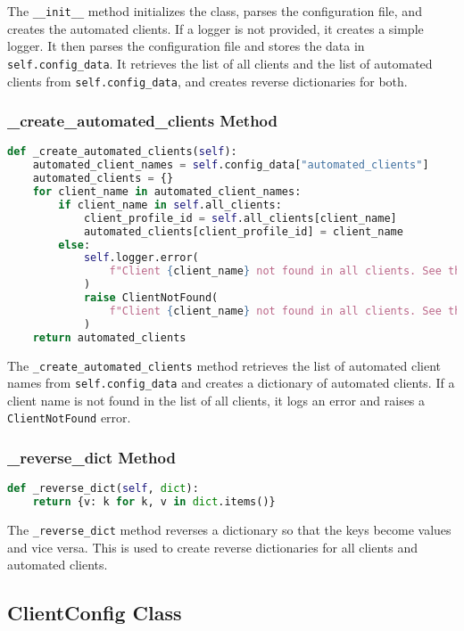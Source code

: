 The \verb|__init__| method initializes the class, parses the configuration file, and creates the automated clients. If a logger is not provided, it creates a simple logger. It then parses the configuration file and stores the data in \verb|self.config_data|. It retrieves the list of all clients and the list of automated clients from \verb|self.config_data|, and creates reverse dictionaries for both.

\subsubsection{\_create\_automated\_clients Method}

\begin{lstlisting}[language=Python]
def _create_automated_clients(self):
    automated_client_names = self.config_data["automated_clients"]
    automated_clients = {}
    for client_name in automated_client_names:
        if client_name in self.all_clients:
            client_profile_id = self.all_clients[client_name]
            automated_clients[client_profile_id] = client_name
        else:
            self.logger.error(
                f"Client {client_name} not found in all clients. See the config file."
            )
            raise ClientNotFound(
                f"Client {client_name} not found in all clients. See the config file."
            )
    return automated_clients
\end{lstlisting}

The \verb|_create_automated_clients| method retrieves the list of automated client names from \verb|self.config_data| and creates a dictionary of automated clients. If a client name is not found in the list of all clients, it logs an error and raises a \verb|ClientNotFound| error.

\subsubsection{\_reverse\_dict Method}

\begin{lstlisting}[language=Python]
def _reverse_dict(self, dict):
    return {v: k for k, v in dict.items()}
\end{lstlisting}

The \verb|_reverse_dict| method reverses a dictionary so that the keys become values and vice versa. This is used to create reverse dictionaries for all clients and automated clients.

\subsection{ClientConfig Class}

